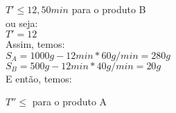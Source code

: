 \documentclass{book}
\begin{document}
$T' \leq 12,50 min$ \quad para o produto B \\

ou seja: \\

$T' = 12$ \\

Assim, temos:\\

$S_A = 1000g - 12min * 60g/min = 280g$ \\

$S_B = 500g - 12min * 40g/min = 20g$ \\

E então, temos:

$T'' \leq $ \quad para o produto A \\

%
%




\end{document}
